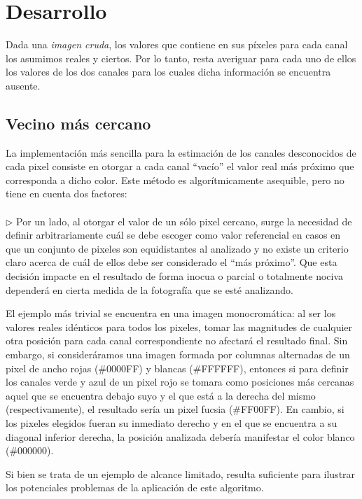 \documentclass[a4paper]{article}
\begin{document}
\newpage
\section{Desarrollo}

Dada una \textit{imagen cruda}, los valores que contiene en sus píxeles para cada canal los asumimos reales y ciertos. Por lo tanto, resta averiguar para cada uno de ellos los valores de los dos canales para los cuales dicha información se encuentra ausente.

\subsection{Vecino m\'as cercano}
La implementación más sencilla para la estimación de los canales desconocidos de cada pixel consiste en otorgar a cada canal ``vacío'' el valor real m\'as pr\'oximo que corresponda a dicho color. Este m\'etodo es algor\'itmicamente asequible, pero no tiene en cuenta dos factores: \\
\\

$\triangleright$ Por un lado, al otorgar el valor de un sólo pixel cercano, surge la necesidad de definir arbitrariamente cuál se debe escoger como valor referencial en casos en que un conjunto de pixeles son equidistantes al analizado y no existe un criterio claro acerca de cuál de ellos debe ser considerado el ``más próximo''. Que esta decisión impacte en el resultado de forma inocua o parcial o totalmente nociva dependerá en cierta medida de la fotografía que se esté analizando.

El ejemplo más trivial se encuentra en una imagen monocromática: al ser los valores reales idénticos para todos los pixeles, tomar las magnitudes de cualquier otra posición para cada canal correspondiente no afectará el resultado final. Sin embargo, si consideráramos una imagen formada por columnas alternadas de un pixel de ancho rojas (\#0000FF) y blancas (\#FFFFFF), entonces si para definir los canales verde y azul de un pixel rojo se tomara como posiciones más cercanas aquel que se encuentra debajo suyo y el que está a la derecha del mismo (respectivamente), el resultado sería un pixel fucsia (\#FF00FF). En cambio, si los pixeles elegidos fueran su inmediato derecho y en el que se encuentra a su diagonal inferior derecha, la posición analizada debería manifestar el color blanco (\#000000).

Si bien se trata de un ejemplo de alcance limitado, resulta suficiente para ilustrar los potenciales problemas de la aplicación de este algoritmo.\\
\end{document}
